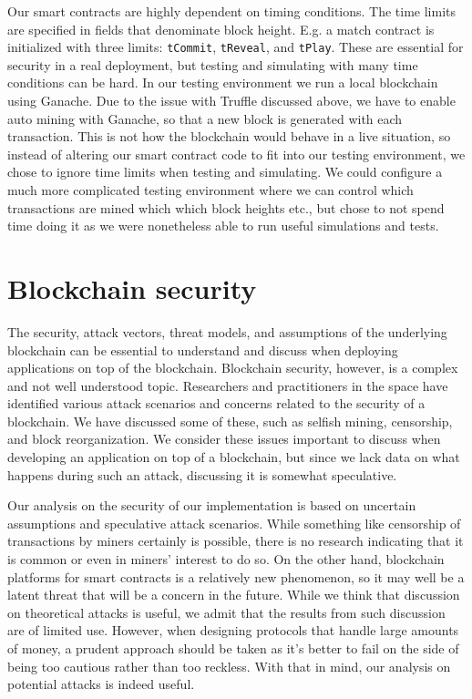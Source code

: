 Our smart contracts are highly dependent on timing conditions. The time limits are specified in fields that denominate block height. E.g. a match contract is initialized with three limits: \texttt{tCommit}, \texttt{tReveal}, and \texttt{tPlay}. These are essential for security in a real deployment, but testing and simulating with many time conditions can be hard. In our testing environment we run a local blockchain using Ganache. Due to the issue with Truffle discussed above, we have to enable auto mining with Ganache, so that a new block is generated with each transaction. This is not how the blockchain would behave in a live situation, so instead of altering our smart contract code to fit into our testing environment, we chose to ignore time limits when testing and simulating. We could configure a much more complicated testing environment where we can control which transactions are mined which which block heights etc., but chose to not spend time doing it as we were nonetheless able to run useful simulations and tests. 

\section{Blockchain security}
\label{sec:discussion-security}

The security, attack vectors, threat models, and assumptions of the underlying blockchain can be essential to understand and discuss when deploying applications on top of the blockchain. Blockchain security, however, is a complex and not well understood topic. Researchers and practitioners in the space have identified various attack scenarios and concerns related to the security of a blockchain. We have discussed some of these, such as selfish mining, censorship, and block reorganization. We consider these issues important to discuss when developing an application on top of a blockchain, but since we lack data on what happens during such an attack, discussing it is somewhat speculative.

Our analysis on the security of our implementation is based on uncertain assumptions and speculative attack scenarios. While something like censorship of transactions by miners certainly is possible, there is no research indicating that it is common or even in miners' interest to do so. On the other hand, blockchain platforms for smart contracts is a relatively new phenomenon, so it may well be a latent threat that will be a concern in the future. While we think that discussion on theoretical attacks is useful, we admit that the results from such discussion are of limited use. However, when designing protocols that handle large amounts of money, a prudent approach should be taken as it's better to fail on the side of being too cautious rather than too reckless. With that in mind, our analysis on potential attacks is indeed useful. 

